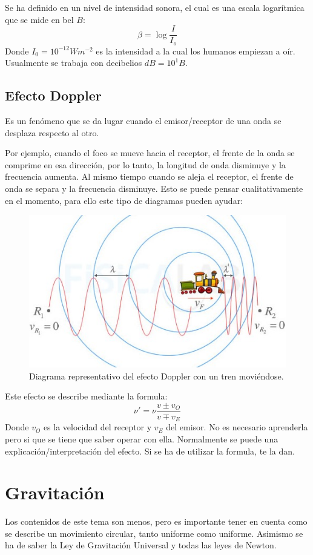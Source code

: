 \documentclass[arial,a4paper,print]{article}
\begin{document}
Se ha definido en un nivel de intensidad sonora, el cual es una escala logarítmica que se mide en bel $\si{B}$:
\begin{equation*}
	\beta = \log\frac{I}{I_{o}}
\end{equation*}
Donde $I_{0} = 10^{-12} \si{Wm^{-2}}$ es la intensidad a la cual los humanos empiezan a oír.
Usualmente se trabaja con decibelios $\si{dB} = 10^1\si{B}$.

\subsection{Efecto Doppler}
Es un fenómeno que se da lugar cuando el emisor/receptor de una onda se desplaza respecto al otro.

Por ejemplo, cuando el foco se mueve hacia el receptor, el frente de la onda se comprime en esa dirección, por lo tanto, la longitud de onda disminuye y la frecuencia aumenta. Al mismo tiempo cuando se aleja el receptor, el frente de onda se separa y la frecuencia disminuye. Esto se puede pensar cualitativamente en el momento, para ello este tipo de diagramas pueden ayudar:
\begin{figure}[h]
	\centering
	\includegraphics[width=0.5\linewidth]{efecto-doppler-2}
	\caption{Diagrama representativo del efecto Doppler con un tren moviéndose.}
	\label{fig:efecto-doppler-2}
\end{figure}

Este efecto se describe mediante la formula:
\begin{equation*}
	\nu' = \nu\frac{v\pm v_{O}}{v\mp v_{E}}
\end{equation*}
Donde $v_{O}$ es la velocidad del receptor y $v_{E}$ del emisor. 
No es necesario aprenderla pero si que se tiene que saber operar con ella. Normalmente se puede una explicación/interpretación del efecto. Si se ha de utilizar la formula, te la dan. 
\pagebreak

\section{Gravitación}
Los contenidos de este tema son menos, pero es importante tener en cuenta como se describe un movimiento circular, tanto uniforme como uniforme. Asimismo se ha de saber la Ley de Gravitación Universal y todas las leyes de Newton. 
\end{document}
